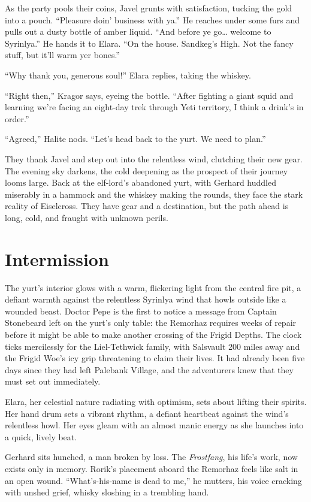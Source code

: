 \documentclass[
  letterpaper,12pt,twoside,twocolumn,openany,
  nodeprecatedcode,bg=full]{dndbook}
\begin{document}
As the party pools their coins, Javel grunts with satisfaction, tucking
the gold into a pouch. ``Pleasure doin' business with ya.'' He reaches
under some furs and pulls out a dusty bottle of amber liquid. ``And
before ye go\ldots{} welcome to Syrinlya.'' He hands it to Elara. ``On
the house. Sandkeg's High. Not the fancy stuff, but it'll warm yer
bones.''

``Why thank you, generous soul!'' Elara replies, taking the whiskey.

``Right then,'' Kragor says, eyeing the bottle. ``After fighting a giant
squid and learning we're facing an eight-day trek through Yeti
territory, I think a drink's in order.''

``Agreed,'' Halite nods. ``Let's head back to the yurt. We need to
plan.''

They thank Javel and step out into the relentless wind, clutching their
new gear. The evening sky darkens, the cold deepening as the prospect of
their journey looms large. Back at the elf-lord's abandoned yurt, with
Gerhard huddled miserably in a hammock and the whiskey making the
rounds, they face the stark reality of Eiselcross. They have gear and a
destination, but the path ahead is long, cold, and fraught with unknown
perils.

\chapter{Intermission}\label{intermission}

The yurt's interior glows with a warm, flickering light from the central
fire pit, a defiant warmth against the relentless Syrinlya wind that
howls outside like a wounded beast. Doctor Pepe is the first to notice a
message from Captain Stonebeard left on the yurt's only table: the
Remorhaz requires weeks of repair before it might be able to make
another crossing of the Frigid Depths. The clock ticks mercilessly for
the Liel-Tethwick family, with Salsvault 200 miles away and the Frigid
Woe's icy grip threatening to claim their lives. It had already been
five days since they had left Palebank Village, and the adventurers knew
that they must set out immediately.

Elara, her celestial nature radiating with optimism, sets about lifting
their spirits. Her hand drum sets a vibrant rhythm, a defiant heartbeat
against the wind's relentless howl. Her eyes gleam with an almost manic
energy as she launches into a quick, lively beat.

Gerhard sits hunched, a man broken by loss. The \emph{Frostfang}, his
life's work, now exists only in memory. Rorik's placement aboard the
Remorhaz feels like salt in an open wound. ``What's-his-name is dead to
me,'' he mutters, his voice cracking with unshed grief, whisky sloshing
in a trembling hand.
\end{document}
